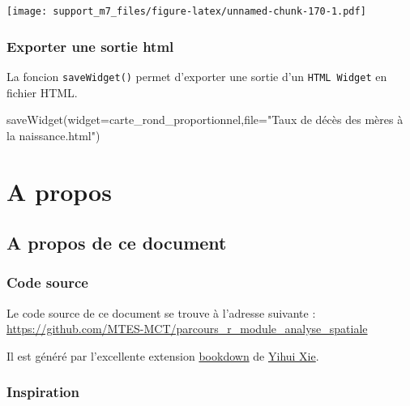 \documentclass[
]{book}
\newenvironment{Shaded}{\begin{snugshade}}{\end{snugshade}}
\newcommand{\AttributeTok}[1]{\textcolor[rgb]{0.77,0.63,0.00}{#1}}
\newcommand{\FunctionTok}[1]{\textcolor[rgb]{0.00,0.00,0.00}{#1}}
\newcommand{\NormalTok}[1]{#1}
\newcommand{\StringTok}[1]{\textcolor[rgb]{0.31,0.60,0.02}{#1}}
\begin{document}
\texttt{[image: support\_m7\_files/figure-latex/unnamed-chunk-170-1.pdf]}

\hypertarget{exporter-une-sortie-html}{%
\section{Exporter une sortie html}\label{exporter-une-sortie-html}}

La foncion \texttt{saveWidget()} permet d'exporter une sortie d'un \texttt{HTML\ Widget} en fichier HTML.

\begin{Shaded}
\begin{Highlighting}[]
\FunctionTok{saveWidget}\NormalTok{(}\AttributeTok{widget=}\NormalTok{carte\_rond\_proportionnel,}\AttributeTok{file=}\StringTok{"Taux de décès des mères à la naissance.html"}\NormalTok{)}
\end{Highlighting}
\end{Shaded}

\hypertarget{part-a-propos}{%
\part{A propos}\label{part-a-propos}}

\hypertarget{a-propos-de-ce-document}{%
\chapter*{A propos de ce document}\label{a-propos-de-ce-document}}

\hypertarget{code-source}{%
\section*{Code source}\label{code-source}}

Le code source de ce document se trouve à l'adresse suivante : \url{https://github.com/MTES-MCT/parcours_r_module_analyse_spatiale}

Il est généré par l'excellente extension \href{https://bookdown.org/yihui/bookdown/}{bookdown} de \href{https://yihui.name/en/}{Yihui Xie}.

\hypertarget{inspiration}{%
\section*{Inspiration}\label{inspiration}}
\end{document}
